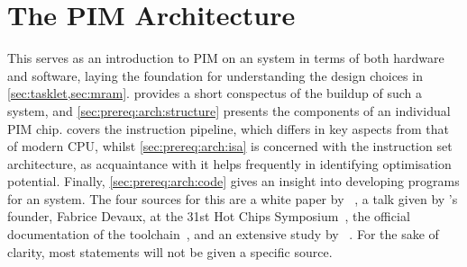 \section[The \texorpdfstring{\abb{PIM}}{PIM} Architecture]{The \acs*{PIM} Architecture}
\label{sec:prereq:arch}

This  serves as an introduction to \ac{PIM} on an \upmem{} system in terms of both hardware and software, laying the foundation for understanding the design choices in \cref{sec:tasklet,sec:mram}.
 provides a short conspectus of the buildup of such a system, and \cref{sec:prereq:arch:structure} presents the components of an individual \ac{PIM} chip.
 covers the instruction pipeline, which differs in key aspects from that of modern \ac{CPU}, whilst \cref{sec:prereq:arch:isa} is concerned with the instruction set architecture, as acquaintance with it helps frequently in identifying optimisation potential.
Finally, \cref{sec:prereq:arch:code} gives an insight into developing programs for an \upmem{} system.
The four sources for this  are a white paper by \upmem{}~\cite{upmem2021WhitePaper}, a talk given by \upmem{}'s founder, Fabrice Devaux, at the 31st Hot Chips Symposium~\cite{upmem2019HotChips}, the official documentation of the \upmem{} toolchain~\cite{upmemSDK}, and an extensive study by \citeauthor{mutlu2022Benchmarking}~\cite{mutlu2022Benchmarking}.
For the sake of clarity, most statements will not be given a specific source.










